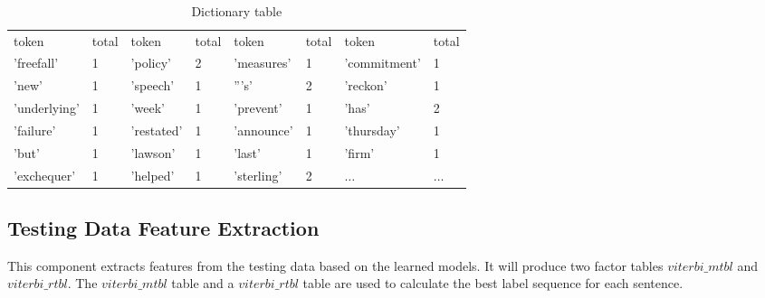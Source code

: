 \begin {table}[h]
\caption {Dictionary table} \label{tab:title} 
\begin{center}
    \scriptsize\tt
    \begin{tabular}{ | l | l || l | l || l | l || l | l | }
    \hline
    token     & total & token   & total & token     & total & token       & total\\
    'freefall'& 1     & 'policy'& 2     & 'measures'&1      & 'commitment'&1\\
    'new'&1& 'speech'&1& '''s'&2& 'reckon'&1\\
    'underlying'&1&'week'&1& 'prevent'&1& 'has'&2\\
    'failure'&1& 'restated'&1&'announce'&1& 'thursday'&1\\
    'but'&1& 'lawson'&1& 'last'&1& 'firm'&1\\
    'exchequer'&1& 'helped'&1& 'sterling'&2& $\ldots$ & $\ldots$\\ 
    \hline
    \end{tabular}
\end{center}
\end {table}


\subsection{Testing Data Feature Extraction}
  This component extracts features from the testing data based on the learned models.
  It will produce two factor tables
  $viterbi\_mtbl$ and  $viterbi\_rtbl$. The $viterbi\_mtbl$
  table and a $viterbi\_rtbl$ table are used to calculate the best label
  sequence for each sentence.

